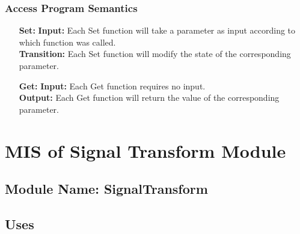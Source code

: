 \documentclass[12pt]{article}
\begin{document}
\subsubsection{Access Program Semantics}
\begin{itemize}

\item[\textbf{Set:}]
\textbf{Input:}
Each Set function will take a parameter as input according to which
function was called.\\
\textbf{Transition:}
Each Set function will modify the state of the corresponding parameter.
 
\item[\textbf{Get:}]
\textbf{Input:}
Each Get function requires no input.\\
\textbf{Output:}
Each Get function will return the value of the corresponding parameter.
 \end{itemize}


\section{MIS of Signal Transform Module}
\subsection{Module Name: SignalTransform}
\subsection{Uses}
\end{document}
